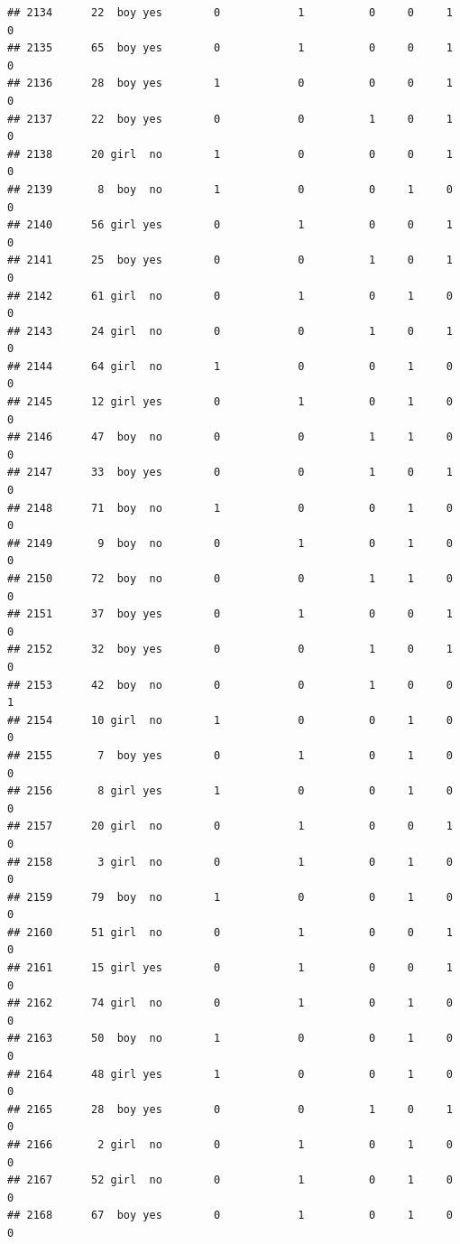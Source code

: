 \documentclass[man]{apa6}
\begin{document}
\begin{verbatim}
## 2134      22  boy yes        0            1          0     0     1     0
## 2135      65  boy yes        0            1          0     0     1     0
## 2136      28  boy yes        1            0          0     0     1     0
## 2137      22  boy yes        0            0          1     0     1     0
## 2138      20 girl  no        1            0          0     0     1     0
## 2139       8  boy  no        1            0          0     1     0     0
## 2140      56 girl yes        0            1          0     0     1     0
## 2141      25  boy yes        0            0          1     0     1     0
## 2142      61 girl  no        0            1          0     1     0     0
## 2143      24 girl  no        0            0          1     0     1     0
## 2144      64 girl  no        1            0          0     1     0     0
## 2145      12 girl yes        0            1          0     1     0     0
## 2146      47  boy  no        0            0          1     1     0     0
## 2147      33  boy yes        0            0          1     0     1     0
## 2148      71  boy  no        1            0          0     1     0     0
## 2149       9  boy  no        0            1          0     1     0     0
## 2150      72  boy  no        0            0          1     1     0     0
## 2151      37  boy yes        0            1          0     0     1     0
## 2152      32  boy yes        0            0          1     0     1     0
## 2153      42  boy  no        0            0          1     0     0     1
## 2154      10 girl  no        1            0          0     1     0     0
## 2155       7  boy yes        0            1          0     1     0     0
## 2156       8 girl yes        1            0          0     1     0     0
## 2157      20 girl  no        0            1          0     0     1     0
## 2158       3 girl  no        0            1          0     1     0     0
## 2159      79  boy  no        1            0          0     1     0     0
## 2160      51 girl  no        0            1          0     0     1     0
## 2161      15 girl yes        0            1          0     0     1     0
## 2162      74 girl  no        0            1          0     1     0     0
## 2163      50  boy  no        1            0          0     1     0     0
## 2164      48 girl yes        1            0          0     1     0     0
## 2165      28  boy yes        0            0          1     0     1     0
## 2166       2 girl  no        0            1          0     1     0     0
## 2167      52 girl  no        0            1          0     1     0     0
## 2168      67  boy yes        0            1          0     1     0     0

\end{verbatim}
\end{document}
